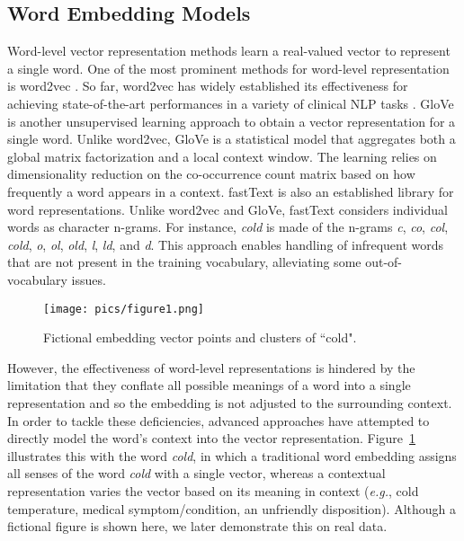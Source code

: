 \documentclass[11pt,a4paper]{article}
\begin{document}
\subsection{Word Embedding Models}
Word-level vector representation methods learn a real-valued vector to represent a single word. One of the most prominent methods for word-level representation is word2vec \cite{mikolov2013distributed}. So far, word2vec has widely established its effectiveness for achieving state-of-the-art performances in a variety of clinical NLP tasks \cite{wang2018comparison}. GloVe \cite{pennington2014glove} is another unsupervised learning approach to obtain a vector representation for a single word. Unlike word2vec, GloVe is a statistical model that aggregates both a global matrix factorization and a local context window. The learning relies on dimensionality reduction on the co-occurrence count matrix based on how frequently a word appears in a context. fastText \cite{bojanowski2016enriching} is also an established library for word representations. Unlike word2vec and GloVe, fastText considers individual words as character n-grams. For instance, \textit{cold} is made of the n-grams \textit{c}, \textit{co}, \textit{col}, \textit{cold}, \textit{o}, \textit{ol}, \textit{old}, \textit{l}, \textit{ld}, and \textit{d}. This approach enables handling of infrequent words that are not present in the training vocabulary, alleviating some out-of-vocabulary issues. 

\begin{figure}[h!]
\centering
\texttt{[image: pics/figure1.png]}
\caption{Fictional embedding vector points and clusters of ``cold". }
\label{figure:cold_example}
\end{figure} 
However, the effectiveness of word-level representations is hindered by the limitation that they conflate all possible meanings of a word into a single representation and so the embedding is not adjusted to the surrounding context. In order to tackle these deficiencies, advanced approaches have attempted to directly model the word's context into the vector representation.
Figure~\ref{figure:cold_example} illustrates this with the word \textit{cold}, in which a traditional word embedding assigns all senses of the word \textit{cold} with a single vector, whereas a contextual representation varies the vector based on its meaning in context (\emph{e.g.}, cold temperature, medical symptom/condition, an unfriendly disposition). Although a fictional figure is shown here, we later demonstrate this on real data. 
\end{document}
